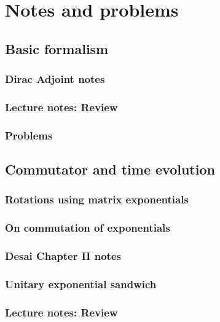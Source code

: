 \part{Notes and problems}
   \chapter{Basic formalism}
      \section{Dirac Adjoint notes}
         
      \section{Lecture notes: Review}
         
   \section{Problems}
      

   \chapter{Commutator and time evolution}
      \section{Rotations using matrix exponentials}
         
      \section{On commutation of exponentials}
         
      \section{Desai Chapter II notes}
         
      \section{Unitary exponential sandwich}
         
      \section{Lecture notes: Review}
         

